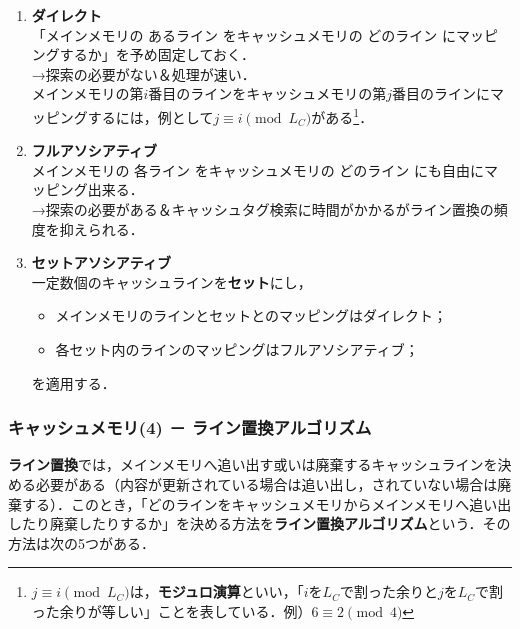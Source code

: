 \begin{enumerate}[label=\textbf{(\Alph*)}, labelsep=10pt, leftmargin=23pt]
	\item \textbf{ダイレクト}\\
		「メインメモリの あるライン をキャッシュメモリの どのライン にマッピングするか」を予め固定しておく．\\
		→\textsf{探索の必要がない＆処理が速い．}\\
		メインメモリの第$i$番目のラインをキャッシュメモリの第$j$番目のラインにマッピングするには，例として$j \equiv i\pmod {L_C}$がある\footnote{$j \equiv i\pmod {L_C}$は，\textbf{モジュロ演算}といい，「$i$を$L_C$で割った余りと$j$を$L_C$で割った余りが等しい」ことを表している．例）$6 \equiv 2\pmod 4$}．
	\item \textbf{フルアソシアティブ}\\
		メインメモリの 各ライン をキャッシュメモリの どのライン にも自由にマッピング出来る．\\
		→探索の必要がある＆キャッシュタグ検索に時間がかかるがライン置換の頻度を抑えられる．
	\item \textbf{セットアソシアティブ}\\
		一定数個のキャッシュラインを\textbf{セット}にし，
		\begin{itemize}
			\item メインメモリのラインとセットとのマッピングはダイレクト；
			\item 各セット内のラインのマッピングはフルアソシアティブ；
		\end{itemize}
		を適用する．
\end{enumerate}



\subsubsection{キャッシュメモリ(4) － ライン置換アルゴリズム}\label{sec:com_arch-2-D-12}

\textbf{ライン置換}では，メインメモリへ追い出す或いは廃棄するキャッシュラインを決める必要がある（内容が更新されている場合は追い出し，されていない場合は廃棄する）．このとき，「どのラインをキャッシュメモリからメインメモリへ追い出したり廃棄したりするか」を決める方法を\textbf{ライン置換アルゴリズム}という．その方法は次の5つがある．

